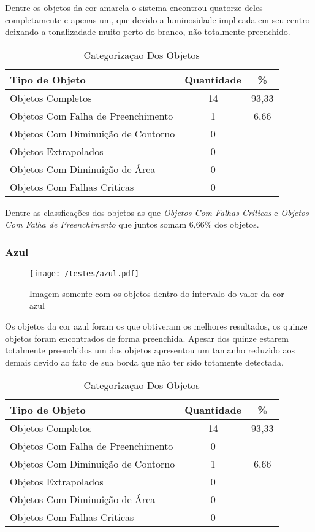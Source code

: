 	Dentre os objetos da cor amarela o sistema encontrou quatorze deles completamente e apenas um, que devido a luminosidade implicada em seu centro deixando a tonalizadade muito perto do branco, não totalmente preenchido.
	
	\begin{table}[H]
\centering
\begin{tabular}{l|c|c}
Tipo de Objeto & Quantidade & \%  \\%
\hline                               %
Objetos Completos & 14 & 93,33 \\
\hline 
Objetos Com Falha de Preenchimento & 1 & 6,66 \\
\hline 
Objetos Com Diminuição de Contorno & 0 &\\
\hline 
Objetos Extrapolados & 0 &\\
\hline 
Objetos Com Diminuição de Área &  0 &\\
\hline 
Objetos Com Falhas Criticas & 0 &\\
\hline 
\end{tabular}
\caption{Categorizaçao Dos Objetos}
\end{table}

Dentre as classficações dos objetos as que  \textit{Objetos Com Falhas Criticas} e \textit{Objetos Com Falha de Preenchimento} que juntos somam 6,66\% dos objetos.

\subsubsection{Azul}
	\begin{figure}[H]
		\centering
		\texttt{[image: /testes/azul.pdf]}
		\caption{Imagem somente com os objetos dentro do intervalo do valor da cor azul}
		\label{disposicaoparte}
	\end{figure}

Os objetos da cor azul foram os que obtiveram os melhores resultados, os quinze objetos foram encontrados de forma preenchida.	Apesar dos quinze estarem totalmente preenchidos um dos objetos apresentou um tamanho reduzido aos demais devido ao fato de sua borda que não ter sido totamente detectada.

\begin{table}[h]
\centering
\begin{tabular}{l|c|c}
Tipo de Objeto & Quantidade & \% \\ %
\hline                               %
Objetos Completos & 14 & 93,33 \\
\hline 
Objetos Com Falha de Preenchimento & 0\\
\hline 
Objetos Com Diminuição de Contorno &  1 & 6,66
\\
\hline 
Objetos Extrapolados &  0\\
\hline 
Objetos Com Diminuição de Área & 0 \\
\hline 
Objetos Com Falhas Criticas & 0 \\
\hline 
\end{tabular}
\caption{Categorizaçao Dos Objetos}
\end{table}

